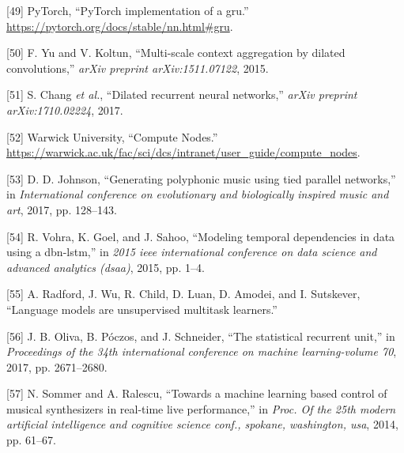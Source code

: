 \documentclass[12pt,]{article}
\begin{document}
\leavevmode\hypertarget{ref-pytorchgru}{}%
{[}49{]} \relax PyTorch, ``PyTorch implementation of a gru.'' \\
\url{https://pytorch.org/docs/stable/nn.html\#gru}.

\leavevmode\hypertarget{ref-yu2015multi}{}%
{[}50{]} F. Yu and V. Koltun, ``Multi-scale context aggregation by
dilated convolutions,'' \emph{arXiv preprint arXiv:1511.07122}, 2015.

\leavevmode\hypertarget{ref-chang2017dilated}{}%
{[}51{]} S. Chang \emph{et al.}, ``Dilated recurrent neural networks,''
\emph{arXiv preprint arXiv:1710.02224}, 2017.

\leavevmode\hypertarget{ref-warwickcomputenodes}{}%
{[}52{]} \relax Warwick University, ``Compute Nodes.'' \\
\url{https://warwick.ac.uk/fac/sci/dcs/intranet/user_guide/compute_nodes}.

\leavevmode\hypertarget{ref-johnson2017generating}{}%
{[}53{]} D. D. Johnson, ``Generating polyphonic music using tied
parallel networks,'' in \emph{International conference on evolutionary
and biologically inspired music and art}, 2017, pp. 128--143.

\leavevmode\hypertarget{ref-vohra2015modeling}{}%
{[}54{]} R. Vohra, K. Goel, and J. Sahoo, ``Modeling temporal
dependencies in data using a dbn-lstm,'' in \emph{2015 ieee
international conference on data science and advanced analytics (dsaa)},
2015, pp. 1--4.

\leavevmode\hypertarget{ref-radford2018language}{}%
{[}55{]} A. Radford, J. Wu, R. Child, D. Luan, D. Amodei, and I.
Sutskever, ``Language models are unsupervised multitask learners.''

\leavevmode\hypertarget{ref-oliva2017statistical}{}%
{[}56{]} J. B. Oliva, B. Póczos, and J. Schneider, ``The statistical
recurrent unit,'' in \emph{Proceedings of the 34th international
conference on machine learning-volume 70}, 2017, pp. 2671--2680.

\leavevmode\hypertarget{ref-sommer2014towards}{}%
{[}57{]} N. Sommer and A. Ralescu, ``Towards a machine learning based
control of musical synthesizers in real-time live performance,'' in
\emph{Proc. Of the 25th modern artificial intelligence and cognitive
science conf., spokane, washington, usa}, 2014, pp. 61--67.
\end{document}
